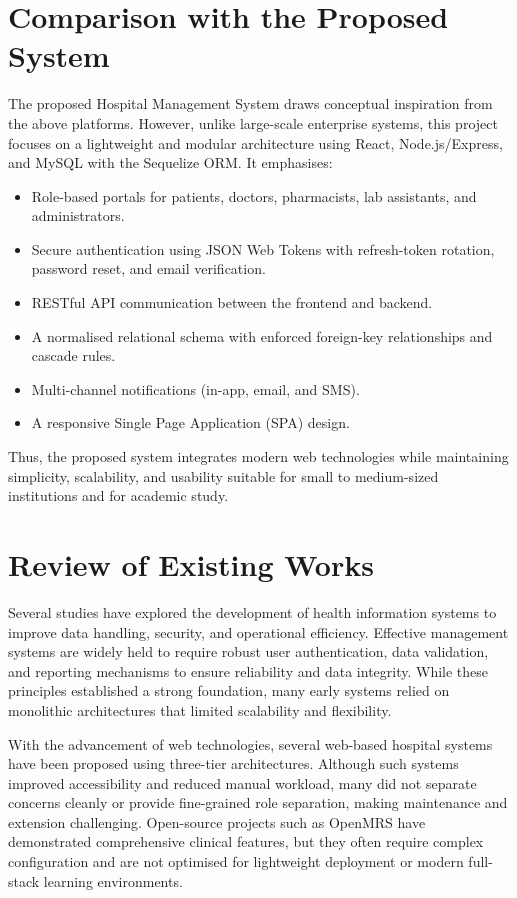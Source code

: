 \documentclass[12pt,a4paper]{report}
\begin{document}
\section{Comparison with the Proposed System}
The proposed Hospital Management System draws conceptual inspiration from the above
platforms. However, unlike large-scale enterprise systems, this project focuses on a
lightweight and modular architecture using React, Node.js/Express, and MySQL with the
Sequelize ORM. It emphasises:
\begin{itemize}[leftmargin=1.4em]
  \item Role-based portals for patients, doctors, pharmacists, lab assistants, and
        administrators.
  \item Secure authentication using JSON Web Tokens with refresh-token rotation,
        password reset, and email verification.
  \item RESTful API communication between the frontend and backend.
  \item A normalised relational schema with enforced foreign-key relationships and
        cascade rules.
  \item Multi-channel notifications (in-app, email, and SMS).
  \item A responsive Single Page Application (SPA) design.
\end{itemize}
Thus, the proposed system integrates modern web technologies while maintaining
simplicity, scalability, and usability suitable for small to medium-sized institutions
and for academic study.

\section{Review of Existing Works}
Several studies have explored the development of health information systems to improve
data handling, security, and operational efficiency. Effective management systems are
widely held to require robust user authentication, data validation, and reporting
mechanisms to ensure reliability and data integrity. While these principles established
a strong foundation, many early systems relied on monolithic architectures that limited
scalability and flexibility.

With the advancement of web technologies, several web-based hospital systems have been
proposed using three-tier architectures. Although such systems improved accessibility
and reduced manual workload, many did not separate concerns cleanly or provide
fine-grained role separation, making maintenance and extension challenging.
Open-source projects such as OpenMRS have demonstrated comprehensive clinical features,
but they often require complex configuration and are not optimised for lightweight
deployment or modern full-stack learning environments.
\end{document}
